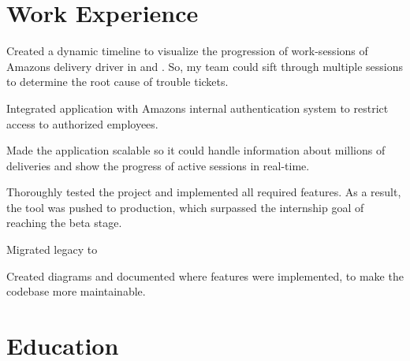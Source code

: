 \documentclass[]{resume-openfont}
\begin{document}
\section{Work Experience}
\begin{tightemize}
    \item Created a dynamic timeline to visualize the progression of work-sessions of Amazon\textquotesingle{}s delivery driver in  and . So, my team could sift through multiple sessions to determine the root cause of trouble tickets.
    \item Integrated application with Amazon\textquotesingle{}s internal authentication system to restrict access to authorized employees.
    \item Made the application scalable so it could handle information about millions of deliveries and show the progress of active sessions in real-time.
    \item Thoroughly tested the project and implemented all required features. As a result, the tool was pushed to production, which surpassed the internship goal of reaching the beta stage.
\end{tightemize}
\sectionsep
{}
\begin{tightemize}
    \item Migrated legacy  to 
    \item Created  diagrams and documented where features were implemented, to make the codebase more maintainable.
\end{tightemize}
\sectionsep

%
%
\section{Education}


\end{document}
